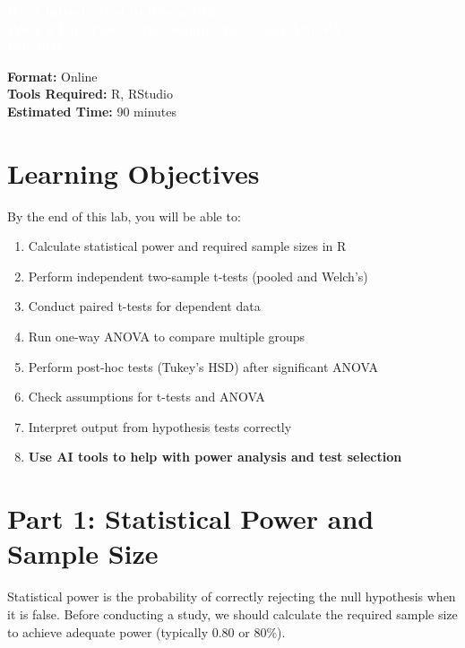 \documentclass[11pt]{article}
\title{}
\author{}
\date{}
\begin{document}
\begin{tcolorbox}[colback=osaorange,colframe=black,boxrule=2pt,arc=0pt,left=3pt,right=3pt,top=6pt,bottom=6pt,boxsep=2pt]
\centering
\textcolor{white}{\textbf{\Large H524 Introduction to Biostatistics}}\\
\textcolor{white}{\textbf{\Large Week 6 Lab: Power, Two-Sample Tests, and ANOVA}}\\
\textcolor{white}{\textbf{\Large Fall 2025}}
\end{tcolorbox}

\vspace{8pt}

\noindent\textbf{Format:} Online\\
\textbf{Tools Required:} R, RStudio\\
\textbf{Estimated Time:} 90 minutes

\section{Learning Objectives}

By the end of this lab, you will be able to:
\begin{enumerate}
\item Calculate statistical power and required sample sizes in R
\item Perform independent two-sample t-tests (pooled and Welch's)
\item Conduct paired t-tests for dependent data
\item Run one-way ANOVA to compare multiple groups
\item Perform post-hoc tests (Tukey's HSD) after significant ANOVA
\item Check assumptions for t-tests and ANOVA
\item Interpret output from hypothesis tests correctly
\item \textcolor{aiblue}{\textbf{Use AI tools to help with power analysis and test selection}}
\end{enumerate}

\section{Part 1: Statistical Power and Sample Size}

Statistical power is the probability of correctly rejecting the null hypothesis when it is false. Before conducting a study, we should calculate the required sample size to achieve adequate power (typically 0.80 or 80\%).
\end{document}

